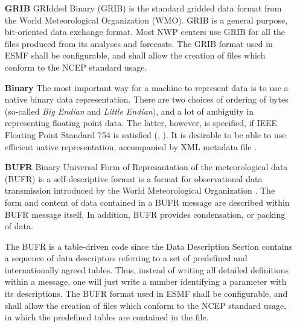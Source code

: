 \begin{itemize}

\item[\bf GRIB] 
GRIdded Binary (GRIB) is the standard gridded data format from the
World Meteorological Organization (WMO).  GRIB is a general purpose,
bit-oriented data exchange format.  Most NWP centers use GRIB for all
the files produced from its analyses and forecasts.  The GRIB format
used in ESMF shall be configurable, and shall allow the creation of
files which conform to the NCEP standard usage.  



\item[\bf Binary]
The most important way for a machine to represent data is to use a
native binary data representation. There are  two choices of ordering of 
bytes (so-called {\it Big Endian} and {\it Little Endian}), and a lot of
ambiguity in representing floating point data. The latter, however, is
specified, if IEEE Floating Point Standard 754 is satisfied 
(\cite{IEEE-Floating-Point}, \cite{Kahan-IEEE-754}). It is
desirable to be able to use efficient native representation,
accompanied by XML metadata file \cite{XML-W3C}. 

\item[\bf BUFR] Binary Universal Form of Represantation of the meteorological 
data (BUFR) is a self-descriptive format is a format for observational data 
transmission introduced by the World Meteorological Organization 
\cite{WMO-BUFR-CREX}. The form and content of data contained in a BUFR 
message are described within BUFR message itself. In addition, BUFR provides 
condensation, or packing of data. 

The BUFR is a table-driven code since the Data Description Section
contains a sequence of data descriptors referring to a set of
predefined and internationally agreed tables. Thus, instead of writing
all detailed definitions within a message, one will just write a
number identifying a parameter with its descriptions. The BUFR format
used in ESMF shall be configurable, and shall allow the creation of
files which conform to the NCEP standard usage, in which the
predefined tables are contained in the file.

\end{itemize}

